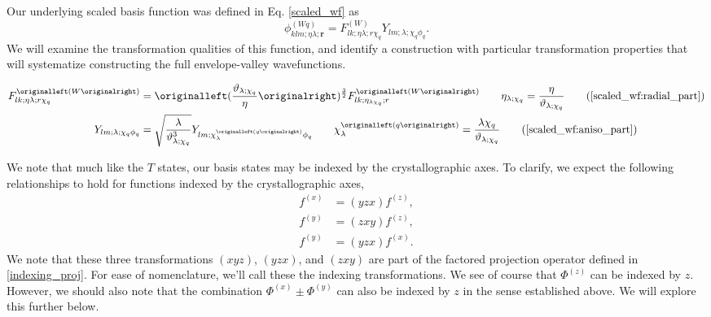 Our underlying scaled basis function was defined in Eq. \eqref{scaled_wf} as
\begin{equation}
  \phi_{klm;\eta\lambda;\bm{r}}^{(Wq)}
  =
  F_{lk;\eta\lambda;r\chi_{q}}^{\left(W\right)}
  Y_{lm;\lambda;\chi_{q}\phi_{q}}.
\end{equation}
We will examine the transformation qualities of this function, and identify a
construction with particular transformation properties that will systematize
constructing the full envelope-valley wavefunctions.



\begin{align}
  F_{lk;\eta\lambda;r\chi_{q}}^{\left(W\right)}
  & = 
  \left(\frac{\vartheta_{\lambda;\chi_{q}}}{\eta}\right)^{\frac{3}{2}}
  F_{lk;\eta_{\lambda\chi_{q}};r}^{\left(W\right)}
  \quad\quad
  \eta_{\lambda;\chi_{q}}
  =
  \frac{\eta}{\vartheta_{\lambda;\chi_{q}}}
  \tag{\ref{scaled_wf:radial_part}}
  \\
  Y_{lm;\lambda;\chi_{q}\phi_{q}}
  & =
  \sqrt{ \frac{\lambda}{\vartheta_{\lambda;\chi_{q}}^{3}} }
  Y_{
    lm;
    \chi_{\lambda}^{\left(q\right)}
    \phi_{q}
  }
  \quad\quad
  \chi_{\lambda}^{\left(q\right)}
  =
  \frac{\lambda\chi_{q}}{\vartheta_{\lambda;\chi_{q}}}
  \tag{\ref{scaled_wf:aniso_part}}
\end{align}




We note that much like the $T$ states, our basis states may be indexed by the
crystallographic axes. To clarify, we expect the following relationships to hold
for functions indexed by the crystallographic axes,
\begin{align}
  f^{\left(x\right)}
  & =
    \left(yzx\right)f^{\left(z\right)},
  \\
  f^{\left(y\right)}
  & =
    \left(zxy\right)f^{\left(z\right)},
  \\
  f^{\left(y\right)}
  & =
    \left(yzx\right)f^{\left(x\right)}.
\end{align}
We note that these three transformations $\left(xyz\right)$, $\left(yzx\right)$,
and $\left(zxy\right)$ are part of the factored projection operator defined in
\eqref{indexing_proj}. For ease of nomenclature, we'll call these the indexing
transformations. We see of course that $\Phi^{\left(z\right)}$ can be indexed by
$z$. However, we should also note that the combination $\Phi^{\left(x\right)}
\pm \Phi^{\left(y\right)}$ can also be indexed by $z$ in the sense established
above. We will explore this further below.

